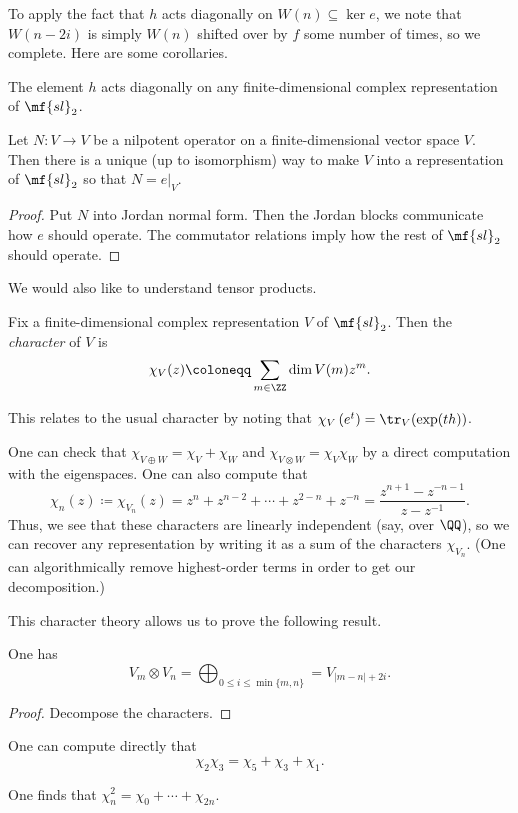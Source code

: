 \documentclass[../notes.tex]{subfiles}
\begin{document}
To apply the fact that $h$ acts diagonally on $W(n)\subseteq\ker e$, we note that $W(n-2i)$ is simply $W(n)$ shifted over by $f$ some number of times, so we complete. Here are some corollaries.
\begin{corollary}
	The element $h$ acts diagonally on any finite-dimensional complex representation of $\mf{sl}_2$.
\end{corollary}
\begin{corollary}
	Let $N\colon V\to V$ be a nilpotent operator on a finite-dimensional vector space $V$. Then there is a unique (up to isomorphism) way to make $V$ into a representation of $\mf{sl}_2$ so that $N=e|_V$.
\end{corollary}
\begin{proof}
	Put $N$ into Jordan normal form. Then the Jordan blocks communicate how $e$ should operate. The commutator relations imply how the rest of $\mf{sl}_2$ should operate.
\end{proof}
We would also like to understand tensor products.
\begin{definition}
	Fix a finite-dimensional complex representation $V$ of $\mf{sl}_2$. Then the \textit{character} of $V$ is
	\[\chi_V(z)\coloneqq\sum_{m\in\ZZ}\dim V(m)z^m.\]
\end{definition}
\begin{remark}
	This relates to the usual character by noting that $\chi_V\left(e^t\right)=\tr_V(\exp(th))$.
\end{remark}
One can check that $\chi_{V\oplus W}=\chi_V+\chi_W$ and $\chi_{V\otimes W}=\chi_V\chi_W$ by a direct computation with the eigenspaces. One can also compute that
\[\chi_n(z)\coloneqq\chi_{V_n}(z)=z^n+z^{n-2}+\cdots+z^{2-n}+z^{-n}=\frac{z^{n+1}-z^{-n-1}}{z-z^{-1}}.\]
Thus, we see that these characters are linearly independent (say, over $\QQ$), so we can recover any representation by writing it as a sum of the characters $\chi_{V_n}$. (One can algorithmically remove highest-order terms in order to get our decomposition.)

This character theory allows us to prove the following result.
\begin{theorem}
	One has
	\[V_m\otimes V_n=\bigoplus_{0\le i\le\min\{m,n\}}=V_{\left|m-n\right|+2i}.\]
\end{theorem}
\begin{proof}
	Decompose the characters.
\end{proof}
\begin{example}
	One can compute directly that
	\[\chi_2\chi_3=\chi_5+\chi_3+\chi_1.\]
\end{example}
\begin{example}
	One finds that $\chi_n^2=\chi_0+\cdots+\chi_{2n}$.
\end{example}
\end{document}
